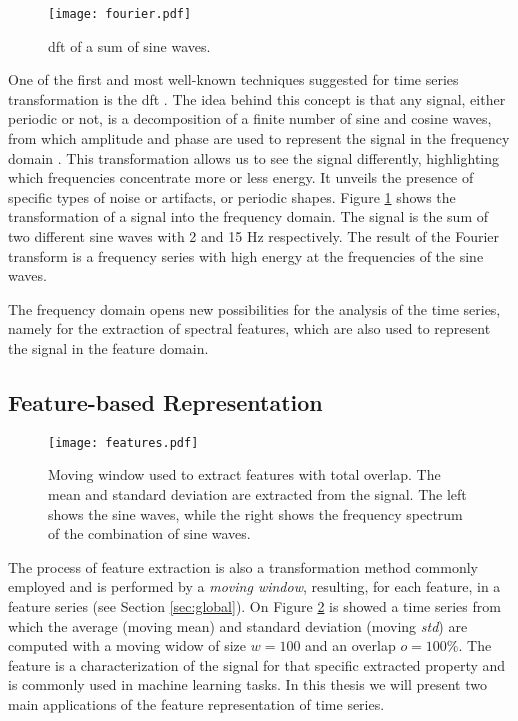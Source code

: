 \begin{figure}
    \centering
    \texttt{[image: fourier.pdf]}
    \caption{\gls{dft} of a sum of sine waves.}
    \label{fig:fourier}
\end{figure}

One of the first and most well-known techniques suggested for time series transformation is the \gls{dft} \cite{fourier}. The idea behind this concept is that any signal, either periodic or not, is a decomposition of a finite number of sine and cosine waves, from which amplitude and phase are used to represent the signal in the frequency domain \cite{fourier2}. This transformation allows us to see the signal differently, highlighting which frequencies concentrate more or less energy. It unveils the presence of specific types of noise or artifacts, or periodic shapes. Figure \ref{fig:fourier} shows the transformation of a signal into the frequency domain. The signal is the sum of two different sine waves with 2 and 15 Hz respectively. The result of the Fourier transform is a frequency series with high energy at the frequencies of the sine waves.

The frequency domain opens new possibilities for the analysis of the time series, namely for the extraction of spectral features, which are also used to represent the signal in the feature domain. 

\subsection{Feature-based Representation}
\label{subsec:features}

\begin{figure}[!h]
\centering
\texttt{[image: features.pdf]}
\caption{Moving window used to extract features with total overlap. The mean and standard deviation are extracted from the signal. The left shows the sine waves, while the right shows the frequency spectrum of the combination of sine waves.}
\label{fig:feature_intro}
\end{figure}

The process of feature extraction is also a transformation method commonly employed and is performed by a \textit{moving window}, resulting, for each feature, in a feature series (see Section \ref{sec:global}). On Figure \ref{fig:feature_intro} is showed a time series from which the average (moving mean) and standard deviation (moving \textit{std}) are computed with a moving widow of size $w=100$ and an overlap $o=100\%$. The feature is a characterization of the signal for that specific extracted property and is commonly used in machine learning tasks. In this thesis we will present two main applications of the feature representation of time series.

